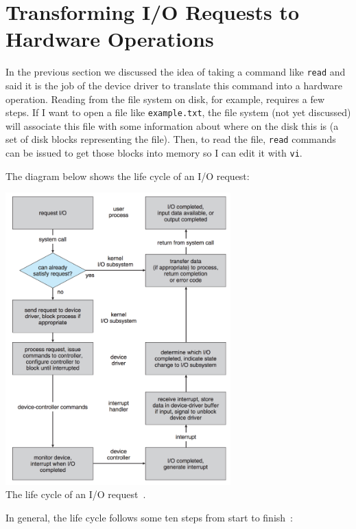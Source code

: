 




\section*{Transforming I/O Requests to Hardware Operations}

In the previous section we discussed the idea of taking a command like \texttt{read} and said it is the job of the device driver to translate this command into a hardware operation. Reading from the file system on disk, for example, requires a few steps. If I want to open a file like \texttt{example.txt}, the file system (not yet discussed) will associate this file with some information about where on the disk this is (a set of disk blocks representing the file). Then, to read the file, \texttt{read} commands can be issued to get those blocks into memory so I can edit it with \texttt{vi}.

The diagram below shows the life cycle of an I/O request:

\begin{center}
	\includegraphics[width=0.65\textwidth]{images/io-lifecycle.png}\\
	The life cycle of an I/O request~\cite{osc}.
\end{center}

In general, the life cycle follows some ten steps from start to finish~\cite{osc}:

